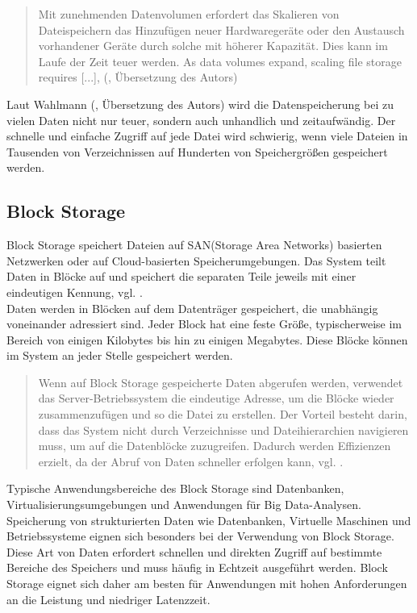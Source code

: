 \begin{quote}
	Mit zunehmenden Datenvolumen erfordert das Skalieren von Dateispeichern das Hinzufügen neuer Hardwaregeräte oder den Austausch vorhandener Geräte durch solche mit höherer Kapazität. Dies kann im Laufe der Zeit teuer werden. \glqq As data volumes expand, scaling file storage requires [...]\grqq, (\cite{nx-fileScala}, Übersetzung des Autors)
\end{quote}

Laut Wahlmann (\citeyear{nx-fileScala}, Übersetzung des Autors) wird die Datenspeicherung bei zu vielen Daten nicht nur teuer, sondern auch unhandlich und zeitaufwändig. Der schnelle und einfache Zugriff auf jede Datei wird schwierig, wenn viele Dateien in Tausenden von Verzeichnissen auf Hunderten von Speichergrößen gespeichert werden. 

\newpage

\subsection{Block Storage}

Block Storage speichert Dateien auf SAN(Storage Area Networks) basierten Netzwerken oder auf Cloud-basierten Speicherumgebungen. Das System teilt Daten in Blöcke auf und speichert die separaten Teile jeweils mit einer eindeutigen Kennung, vgl. \cite{ibm-topics}.\\

Daten werden in Blöcken auf dem Datenträger gespeichert, die unabhängig voneinander adressiert sind. Jeder Block hat eine feste Größe, typischerweise im Bereich von einigen Kilobytes bis hin zu einigen Megabytes. Diese Blöcke können im System an jeder Stelle gespeichert werden.

\begin{quote}
	Wenn auf Block Storage gespeicherte Daten abgerufen werden, verwendet das Server-Betriebssystem die eindeutige Adresse, um die Blöcke wieder zusammenzufügen und so die Datei zu erstellen. Der Vorteil besteht darin, dass das System nicht durch Verzeichnisse und Dateihierarchien navigieren muss, um auf die Datenblöcke zuzugreifen. Dadurch werden Effizienzen erzielt, da der Abruf von Daten schneller erfolgen kann, vgl. \cite{ibm-storage}.
\end{quote}

Typische Anwendungsbereiche des Block Storage sind Datenbanken, Virtualisierungsumgebungen und Anwendungen für Big Data-Analysen. Speicherung von strukturierten Daten wie Datenbanken, Virtuelle Maschinen und Betriebssysteme eignen sich besonders bei der Verwendung von Block Storage. Diese Art von Daten erfordert schnellen und direkten Zugriff auf bestimmte Bereiche des Speichers und muss häufig in Echtzeit ausgeführt werden. Block Storage eignet sich daher am besten für Anwendungen mit hohen Anforderungen an die Leistung und niedriger Latenzzeit.

